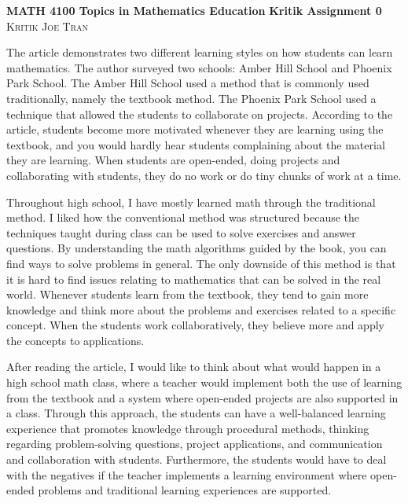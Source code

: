 \documentclass[11pt]{amsart}
\begin{document}
\textbf{MATH 4100 Topics in Mathematics Education} \hfill \textbf{Kritik Assignment 0} \\
\textsc{Kritik} \hfill \textsc{Joe Tran}

\quad The article demonstrates two different learning styles on how students can learn mathematics. The author surveyed two schools: Amber Hill School and Phoenix Park School. The Amber Hill School used a method that is commonly used traditionally, namely the textbook method. The Phoenix Park School used a technique that allowed the students to collaborate on projects. According to the article, students become more motivated whenever they are learning using the textbook, and you would hardly hear students complaining about the material they are learning. When students are open-ended, doing projects and collaborating with students, they do no work or do tiny chunks of work at a time.

\quad Throughout high school, I have mostly learned math through the traditional method. I liked how the conventional method was structured because the techniques taught during class can be used to solve exercises and answer questions. By understanding the math algorithms guided by the book, you can find ways to solve problems in general. The only downside of this method is that it is hard to find issues relating to mathematics that can be solved in the real world. Whenever students learn from the textbook, they tend to gain more knowledge and think more about the problems and exercises related to a specific concept. When the students work collaboratively, they believe more and apply the concepts to applications. 

\quad After reading the article, I would like to think about what would happen in a high school math class, where a teacher would implement both the use of learning from the textbook and a system where open-ended projects are also supported in a class. Through this approach, the students can have a well-balanced learning experience that promotes knowledge through procedural methods, thinking regarding problem-solving questions, project applications, and communication and collaboration with students. Furthermore, the students would have to deal with the negatives if the teacher implements a learning environment where open-ended problems and traditional learning experiences are supported.
\end{document}

